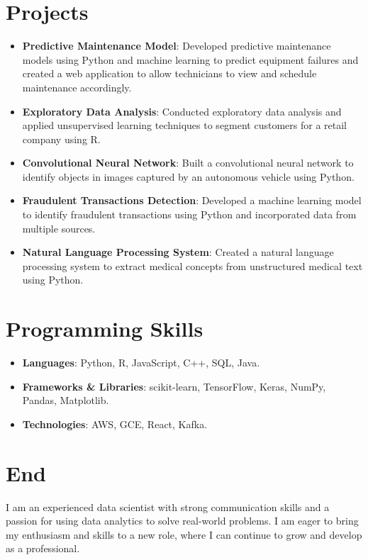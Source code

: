 \documentclass[letterpaper,11pt]{article}
\newcommand{\resumeItem}[2]{
  \item\small{
    \textbf{#1}{: #2 \vspace{-2pt}}
  }
}
\newcommand{\resumeSubItem}[2]{\resumeItem{#1}{#2}\vspace{-4pt}}
\newcommand{\resumeSubHeadingListStart}{\begin{itemize}[leftmargin=*]}
\newcommand{\resumeSubHeadingListEnd}{\end{itemize}}
\begin{document}
\section{Projects}
  \resumeSubHeadingListStart
    \resumeSubItem{Predictive Maintenance Model}
      {Developed predictive maintenance models using Python and machine learning to predict equipment failures and created a web application to allow technicians to view and schedule maintenance accordingly.}
    \resumeSubItem{Exploratory Data Analysis}
     {Conducted exploratory data analysis and applied unsupervised learning techniques to segment customers for a retail company using R.}
    \resumeSubItem{Convolutional Neural Network}
      {Built a convolutional neural network to identify objects in images captured by an autonomous vehicle using Python.}
    \resumeSubItem{Fraudulent Transactions Detection}
      {Developed a machine learning model to identify fraudulent transactions using Python and incorporated data from multiple sources.}
    \resumeSubItem{Natural Language Processing System}
      {Created a natural language processing system to extract medical concepts from unstructured medical text using Python.}
  \resumeSubHeadingListEnd

\section{Programming Skills}
 \resumeSubHeadingListStart
  \resumeSubItem{Languages}
    {Python, R, JavaScript, C++, SQL, Java.}
  \resumeSubItem{Frameworks \& Libraries}
    {scikit-learn, TensorFlow, Keras, NumPy, Pandas, Matplotlib.}
  \resumeSubItem{Technologies}
    {AWS, GCE, React, Kafka.}
 \resumeSubHeadingListEnd

\section{End}
I am an experienced data scientist with strong communication skills and a passion for using data analytics to solve real-world problems. I am eager to bring my enthusiasm and skills to a new role, where I can continue to grow and develop as a professional.
\end{document}
